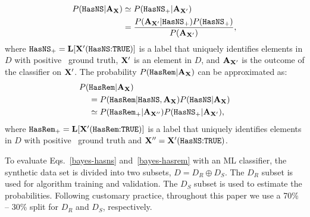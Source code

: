 \begin{align}
\label{bayes-hasns}
P({{\tt HasNS}}|{\bf A}_{\bf X})&\simeq P({{\tt HasNS}}_+|{\bf A}_{{\bf X}'}) \nonumber \\
&=\frac{P({\bf A}_{{\bf X}'}|{{\tt HasNS}}_+)P({{\tt HasNS}}_+)}{P({\bf A}_{{\bf X}'})},
\end{align}
where ${{\tt HasNS}}_+={\bf L}[{\bf X}'(\hbox{{{\tt HasNS}}:{{\tt TRUE}}})]$ is a label that uniquely identifies elements in $D$ with positive \hasns\ ground truth, ${\bf X}'$ is an element in $D$, and ${\bf A}_{{\bf X}'}$ is the outcome of the classifier on ${\bf X}'$. The probability $P({{\tt HasRem}}|{\bf A}_{\bf X})$ can be approximated as:
\begin{align}
\label{bayes-hasrem}
P(&{{\tt HasRem}}|{\bf A}_{\bf X}) \nonumber  \\
&=P({{\tt HasRem}}|{{\tt HasNS}}, {\bf A}_{\bf X})P({{\tt HasNS}}|{\bf A}_{\bf X}) \nonumber \\
&\simeq P({{\tt HasRem}}_+|{\bf A}_{{\bf X}''})P({{\tt HasNS}}_+|{\bf A}_{{\bf X}'}),
\end{align}
where ${{\tt HasRem}}_+={\bf L}[{\bf X}'(\hbox{{{\tt HasRem}}:{{\tt TRUE}}})]$ is a label that uniquely identifies elements in $D$ with positive \hasrem\ ground truth and ${\bf X}''= {\bf X}'(\hbox{{{\tt HasNS}}:{{\tt TRUE}}})$.

To evaluate Eqs.~\eqref{bayes-hasns} and~\eqref{bayes-hasrem} with an \ac{ML} classifier, the synthetic data set is divided into two subsets, $D=D_R\oplus D_S$. The $D_R$ subset is used for
algorithm training and validation. The $D_S$ subset is used to estimate the probabilities. Following customary practice, throughout this paper we use a 70\% -- 30\% split for $D_R$ and $D_S$,
respectively.

